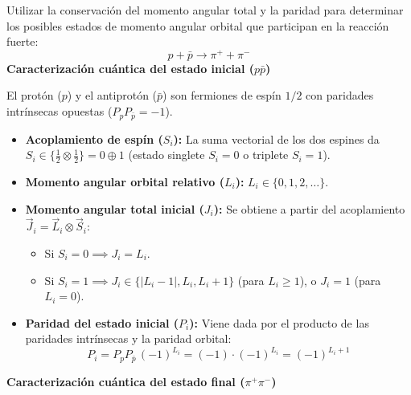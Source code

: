 \newpage
\begin{problema}
Utilizar la conservación del momento angular total y la paridad para determinar los posibles estados de momento angular orbital que participan en la reacción fuerte:
\begin{equation*}
    p + \bar{p} \longrightarrow \pi^+ + \pi^-
\end{equation*}
\tcblower
\textbf{Caracterización cuántica del estado inicial ($p\bar{p}$)}

El protón ($p$) y el antiprotón ($\bar{p}$) son fermiones de espín $1/2$ con paridades intrínsecas opuestas ($P_p P_{\bar{p}} = -1$).
\begin{itemize}
    \item \textbf{Acoplamiento de espín ($S_i$):} La suma vectorial de los dos espines da $S_i \in \{\frac{1}{2} \otimes \frac{1}{2}\} = 0 \oplus 1$ (estado singlete $S_i = 0$ o triplete $S_i = 1$).
    \item \textbf{Momento angular orbital relativo ($L_i$):} $L_i \in \{0, 1, 2, \dots\}$.
    \item \textbf{Momento angular total inicial ($J_i$):} Se obtiene a partir del acoplamiento $\vec{J}_i = \vec{L}_i \otimes \vec{S}_i$:
    \begin{itemize}
        \item Si $S_i = 0 \implies J_i = L_i$.
        \item Si $S_i = 1 \implies J_i \in \{|L_i - 1|, L_i, L_i + 1\}$ (para $L_i \ge 1$), o $J_i = 1$ (para $L_i = 0$).
    \end{itemize}
    \item \textbf{Paridad del estado inicial ($P_i$):} Viene dada por el producto de las paridades intrínsecas y la paridad orbital:
    \begin{equation*}
        P_i = P_p P_{\bar{p}} \, (-1)^{L_i} = (-1) \cdot (-1)^{L_i} = (-1)^{L_i + 1}
    \end{equation*}
\end{itemize}

\textbf{Caracterización cuántica del estado final ($\pi^+\pi^-$)}


\end{problema}
